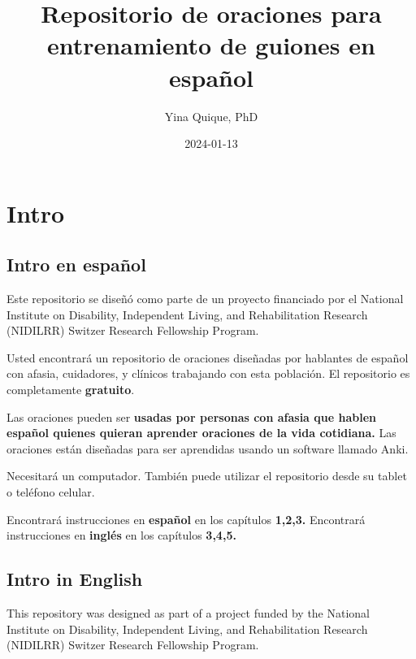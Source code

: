 \documentclass[
]{book}
\title{Repositorio de oraciones para entrenamiento de guiones en español}
\author{Yina Quique, PhD}
\date{2024-01-13}
\begin{document}
\maketitle

{
\setcounter{tocdepth}{1}
\tableofcontents
}
\hypertarget{intro}{%
\chapter*{Intro}\label{intro}}

\hypertarget{intro-en-espauxf1ol}{%
\section*{\texorpdfstring{Intro en \textbf{español}}{Intro en español}}\label{intro-en-espauxf1ol}}

Este repositorio se diseñó como parte de un proyecto financiado por el National Institute on Disability, Independent Living, and Rehabilitation Research (NIDILRR) Switzer Research Fellowship Program.

Usted encontrará un repositorio de oraciones diseñadas por hablantes de español con afasia, cuidadores, y clínicos trabajando con esta población. El repositorio es completamente \textbf{gratuito}.

Las oraciones pueden ser \textbf{usadas por personas con afasia que hablen español quienes quieran aprender oraciones de la vida cotidiana.} Las oraciones están diseñadas para ser aprendidas usando un software llamado Anki.

Necesitará un computador. También puede utilizar el repositorio desde su tablet o teléfono celular.

Encontrará instrucciones en \textbf{español} en los capítulos \textbf{1,2,3.}
Encontrará instrucciones en \textbf{inglés} en los capítulos \textbf{3,4,5.}

\hypertarget{intro-in-english}{%
\section*{\texorpdfstring{Intro in \textbf{English}}{Intro in English}}\label{intro-in-english}}

This repository was designed as part of a project funded by the National Institute on Disability, Independent Living, and Rehabilitation Research (NIDILRR) Switzer Research Fellowship Program.
\end{document}
